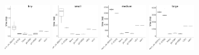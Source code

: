 \documentclass[../document.tex]{subfiles}
\begin{document}
\begin{figure}
	\begin{subfigure}{0.09\textwidth} \label{fig:time-gem} \vspace{5mm}\end{subfigure}
	\begin{subfigure}{0.9\textwidth}
		\includegraphics[width=0.22\textwidth]{figures/time-results/generate_gem_tiny_boxplot-1}
		\includegraphics[width=0.22\textwidth]{figures/time-results/generate_gem_small_boxplot-1}
		\includegraphics[width=0.22\textwidth]{figures/time-results/generate_gem_medium_boxplot-1}
		\includegraphics[width=0.22\textwidth]{figures/time-results/generate_gem_large_boxplot-1}
		\end{subfigure}


\end{figure}
\end{document}
